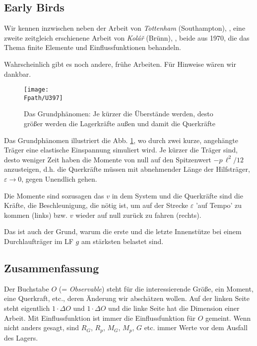 {{{{{{\textcolor{blau2}{\subsection{Early Birds}}
Wir kennen inzwischen neben der Arbeit von {\em Tottenham\/} (Southampton), \cite{Tottenham},  eine zweite zeitgleich erschienene Arbeit von {\em Kol\'{a}\v{r}\/} (Br\"{u}nn), \cite{Kolar}, beide aus 1970, die das Thema finite Elemente und Einflussfunktionen behandeln.

Wahrscheinlich gibt es noch andere, fr\"{u}he Arbeiten. F\"{u}r Hinweise w\"{a}ren wir dankbar.

\begin{figure}
\centering
\texttt{[image: \\Fpath/U397]}
\caption{Das Grundph\"{a}nomen: Je k\"{u}rzer die \"{U}berst\"{a}nde werden, desto gr\"{o}{\ss}er werden die Lagerkr\"{a}fte au{\ss}en und damit die Querkr\"{a}fte}
\label{U397X8}%
\end{figure}%


Das Grundph\"{a}nomen illustriert die Abb. \ref{U397X8}, wo durch zwei kurze, angeh\"{a}ngte Tr\"{a}ger eine elastische Einspannung simuliert wird. Je k\"{u}rzer die Tr\"{a}ger sind, desto weniger Zeit haben die Momente von null auf den Spitzenwert $- p\,\ell^2/12$ anzusteigen, d.h. die Querkr\"{a}fte m\"{u}ssen mit abnehmender L\"{a}nge der Hilfstr\"{a}ger, $\varepsilon \to 0$, gegen Unendlich gehen.

Die Momente sind sozusagen das $v$ in dem System und die Querkr\"{a}fte sind die Kr\"{a}fte, die Beschleunigung, die n\"{o}tig ist, um auf der Strecke $\varepsilon$ 'auf Tempo' zu kommen (links) bzw. $v$ wieder auf null zur\"{u}ck zu fahren (rechts).

Das ist auch der Grund, warum die erste und die letzte Innenst\"{u}tze bei einem Durchlauftr\"{a}ger im LF $g$ am st\"{a}rksten belastet sind.

\textcolor{blau2}{\section{Zusammenfassung}}
Der Buchstabe $O$ (= {\em Observable\/}) steht f\"{u}r die interessierende Gr\"{o}{\ss}e, ein Moment, eine Querkraft, etc., deren \"{A}nderung wir absch\"{a}tzen wollen. Auf der linken Seite steht eigentlich $1 \cdot \Delta O$ und $1 \cdot \Delta O$ und die linke Seite hat die Dimension einer Arbeit. Mit Einflussfunktion ist immer die Einflussfunktion f\"{u}r $O$ gemeint. Wenn nicht anders gesagt, sind $R_G$, $R_p$, $M_G$, $M_p$, $G$ etc. immer Werte vor dem Ausfall des Lagers.

}}}}}}
